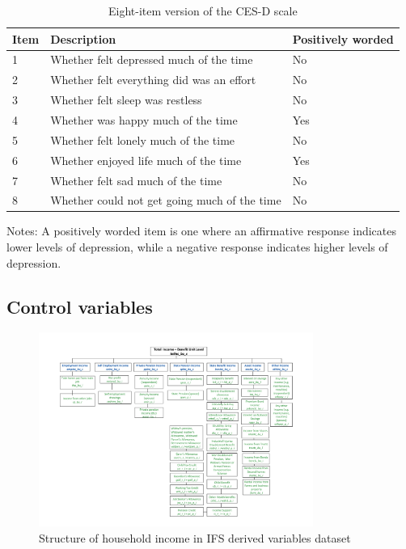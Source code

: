 \begin{table}[h!]
    \centering
    \caption{Eight-item version of the CES-D scale}
    \label{tab:cesd}
    \begin{threeparttable}
        \begin{tabular}{lll}
            \toprule
            Item & Description & Positively worded \\
            \midrule
            1 & Whether felt depressed much of the time & No \\
            2 & Whether felt everything did was an effort & No \\
            3 & Whether felt sleep was restless & No \\
            4 & Whether was happy much of the time & Yes \\
            5 & Whether felt lonely much of the time & No \\
            6 & Whether enjoyed life much of the time & Yes \\
            7 & Whether felt sad much of the time & No \\
            8 & Whether could not get going much of the time & No \\
            \bottomrule
        \end{tabular}
        \begin{tablenotes}
            \footnotesize
            \item Notes: A positively worded item is one where an affirmative response indicates lower levels of depression, while a negative response indicates higher levels of depression.
        \end{tablenotes}
    \end{threeparttable}
\end{table}

\subsection{Control variables}

\begin{figure}
    \centering
    \caption{Structure of household income in IFS derived variables dataset}
    \label{fig:household_income}
    \includegraphics[width=0.8\textwidth]{figures/household_income.jpg}
\end{figure}



